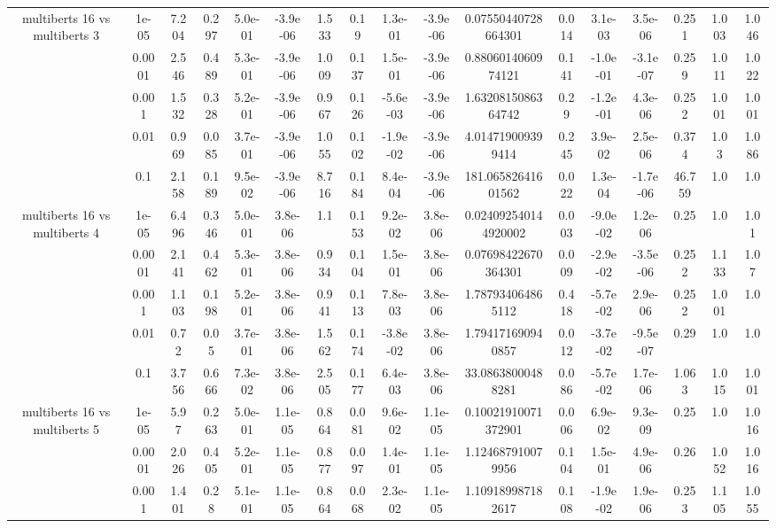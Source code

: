 \begin{tabular}{|c|c|c|c|c|c|c|c|c|c|c|c|c|c|c|c|c|}
\hline
\multirow{5}{*}{multiberts 16 vs multiberts 3} & 1e-05 & 7.204 & 0.297 & 5.0e-01 & -3.9e-06 & 1.533 & 0.19 & 1.3e-01 & -3.9e-06 & 0.07550440728664301 & 0.014 & 3.1e-03 & 3.5e-06 & 0.251 & 1.003 & 1.046 \\
 & 0.0001 & 2.546 & 0.489 & 5.3e-01 & -3.9e-06 & 1.009 & 0.137 & 1.5e-01 & -3.9e-06 & 0.8806014060974121 & 0.141 & -1.0e-01 & -3.1e-07 & 0.259 & 1.011 & 1.022 \\
 & 0.001 & 1.532 & 0.328 & 5.2e-01 & -3.9e-06 & 0.967 & 0.126 & -5.6e-03 & -3.9e-06 & 1.6320815086364742 & 0.29 & -1.2e-01 & 4.3e-06 & 0.252 & 1.001 & 1.001 \\
 & 0.01 & 0.969 & 0.085 & 3.7e-01 & -3.9e-06 & 1.055 & 0.102 & -1.9e-02 & -3.9e-06 & 4.014719009399414 & 0.245 & 3.9e-02 & 2.5e-06 & 0.374 & 1.03 & 1.086 \\
 & 0.1 & 2.158 & 0.189 & 9.5e-02 & -3.9e-06 & 8.716 & 0.184 & 8.4e-04 & -3.9e-06 & 181.06582641601562 & 0.022 & 1.3e-04 & -1.7e-06 & 46.759 & 1.0 & 1.0 \\
\hline
\multirow{5}{*}{multiberts 16 vs multiberts 4} & 1e-05 & 6.496 & 0.346 & 5.0e-01 & 3.8e-06 & 1.1 & 0.153 & 9.2e-02 & 3.8e-06 & 0.024092540144920002 & 0.003 & -9.0e-02 & 1.2e-06 & 0.25 & 1.0 & 1.01 \\
 & 0.0001 & 2.141 & 0.462 & 5.3e-01 & 3.8e-06 & 0.934 & 0.104 & 1.5e-01 & 3.8e-06 & 0.07698422670364301 & 0.009 & -2.9e-02 & -3.5e-06 & 0.252 & 1.133 & 1.07 \\
 & 0.001 & 1.103 & 0.198 & 5.2e-01 & 3.8e-06 & 0.941 & 0.113 & 7.8e-03 & 3.8e-06 & 1.787934064865112 & 0.418 & -5.7e-02 & 2.9e-06 & 0.252 & 1.001 & 1.0 \\
 & 0.01 & 0.72 & 0.05 & 3.7e-01 & 3.8e-06 & 1.562 & 0.174 & -3.8e-02 & 3.8e-06 & 1.794171690940857 & 0.012 & -3.7e-02 & -9.5e-07 & 0.29 & 1.0 & 1.0 \\
 & 0.1 & 3.756 & 0.666 & 7.3e-02 & 3.8e-06 & 2.505 & 0.177 & 6.4e-03 & 3.8e-06 & 33.08638000488281 & 0.086 & -5.7e-02 & 1.7e-06 & 1.063 & 1.015 & 1.001 \\
\hline
\multirow{5}{*}{multiberts 16 vs multiberts 5} & 1e-05 & 5.97 & 0.263 & 5.0e-01 & 1.1e-05 & 0.864 & 0.081 & 9.6e-02 & 1.1e-05 & 0.10021910071372901 & 0.006 & 6.9e-02 & 9.3e-09 & 0.25 & 1.0 & 1.016 \\
 & 0.0001 & 2.026 & 0.405 & 5.2e-01 & 1.1e-05 & 0.877 & 0.097 & 1.4e-01 & 1.1e-05 & 1.124687910079956 & 0.104 & 1.5e-01 & 4.9e-06 & 0.26 & 1.052 & 1.016 \\
 & 0.001 & 1.401 & 0.28 & 5.1e-01 & 1.1e-05 & 0.864 & 0.068 & 2.3e-02 & 1.1e-05 & 1.109189987182617 & 0.108 & -1.9e-02 & 1.9e-06 & 0.253 & 1.105 & 1.055 \\

\end{tabular}
